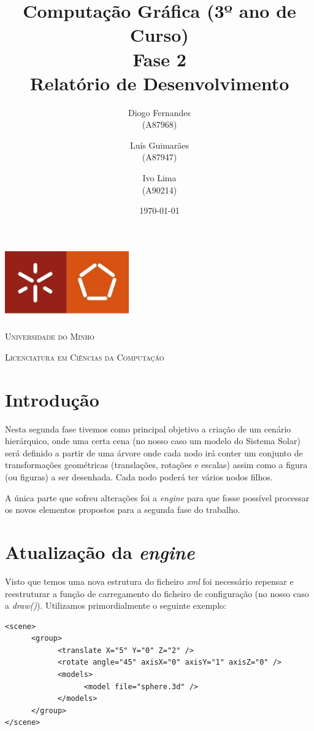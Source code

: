 \documentclass[11pt,a4paper]{report}
\title{Computação Gráfica (3º ano de Curso)\\
       \textbf{Fase 2}\\ Relatório de Desenvolvimento
       } %
\author{Diogo Fernandes\\ (A87968) \and Luís Guimarães\\ (A87947)
         \and Ivo Lima\\ (A90214)
       } %
\date{\today} %
\begin{document}
	\begin{minipage}{0.9\linewidth}
        \centering
		\includegraphics[width=0.4\textwidth]{um.jpeg}\par\vspace{1cm}
		{\scshape\LARGE Universidade do Minho} \par
		\vspace{0.6cm}
		{\scshape\Large Licenciatura em Ciências da Computação} \par
		\maketitle
	\end{minipage}

\tableofcontents %

\chapter{Introdução}

Nesta segunda fase tivemos como principal objetivo a criação de um cenário hierárquico, onde uma certa cena (no nosso caso um modelo do Sistema Solar) será definido a partir de uma árvore onde cada nodo irá conter um conjunto de transformações geométricas (translações, rotações e escalas) assim como a figura (ou figuras) a ser desenhada. Cada nodo poderá ter vários nodos filhos.

A única parte que sofreu alterações foi a \emph{engine} para que fosse possível processar os novos elementos propostos para a segunda fase do trabalho.

\chapter{Atualização da \emph{engine}}
Visto que temos uma nova estrutura do ficheiro \emph{xml} foi necessário repensar e reestruturar a função de carregamento do ficheiro de configuração (no nosso caso a \emph{draw()}). Utilizamos primordialmente o seguinte exemplo:

\begin{lstlisting}
<scene>
      <group>
            <translate X="5" Y="0" Z="2" />
            <rotate angle="45" axisX="0" axisY="1" axisZ="0" />
            <models>
                  <model file="sphere.3d" />
            </models>
      </group>
</scene>
\end{lstlisting}
\end{document}

